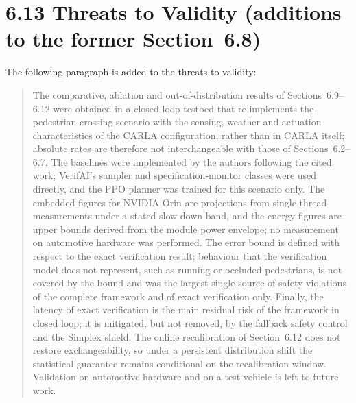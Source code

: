 \documentclass[11pt]{article}
\begin{document}
\section*{6.13 \quad Threats to Validity (additions to the former Section~6.8)}
The following paragraph is added to the threats to validity:
\begin{quote}
The comparative, ablation and out-of-distribution results of Sections~6.9--6.12 were obtained in a closed-loop testbed that re-implements the pedestrian-crossing scenario with the sensing, weather and actuation characteristics of the CARLA configuration, rather than in CARLA itself; absolute rates are therefore not interchangeable with those of Sections~6.2--6.7. The baselines were implemented by the authors following the cited work; VerifAI's sampler and specification-monitor classes were used directly, and the PPO planner was trained for this scenario only. The embedded figures for NVIDIA Orin are projections from single-thread measurements under a stated slow-down band, and the energy figures are upper bounds derived from the module power envelope; no measurement on automotive hardware was performed. The error bound is defined with respect to the exact verification result; behaviour that the verification model does not represent, such as running or occluded pedestrians, is not covered by the bound and was the largest single source of safety violations of the complete framework and of exact verification only. Finally, the latency of exact verification is the main residual risk of the framework in closed loop; it is mitigated, but not removed, by the fallback safety control and the Simplex shield. The online recalibration of Section~6.12 does not restore exchangeability, so under a persistent distribution shift the statistical guarantee remains conditional on the recalibration window. Validation on automotive hardware and on a test vehicle is left to future work.
\end{quote}
\end{document}
